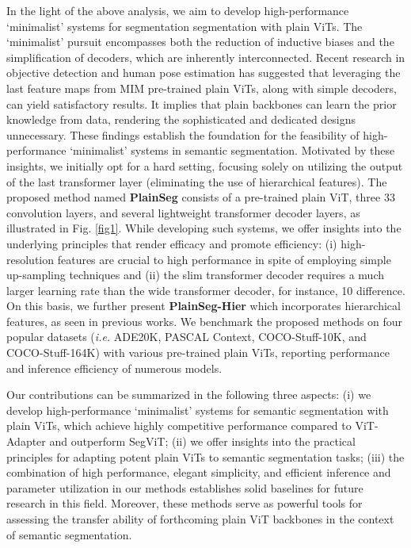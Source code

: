 \documentclass{article} \usepackage{iclr2024_conference,times}
\begin{document}
In the light of the above analysis, we aim to develop high-performance `minimalist' systems for segmentation segmentation with plain ViTs. The `minimalist' pursuit encompasses both the reduction of inductive biases and the simplification of decoders, which are inherently interconnected. Recent research in objective detection \citep{li2022exploring} and human pose estimation \citep{xu2022vitpose} has suggested that leveraging the last feature maps from MIM pre-trained plain ViTs, along with simple decoders, can yield satisfactory results. It implies that plain backbones can learn the prior knowledge from data, rendering the sophisticated and dedicated designs unnecessary. These findings establish the foundation for the feasibility of high-performance `minimalist' systems in semantic segmentation. Motivated by these insights, we initially opt for a hard setting, focusing solely on utilizing the output of the last transformer layer (eliminating the use of hierarchical features). The proposed method named \textbf{PlainSeg} consists of a pre-trained plain ViT, three 33 convolution layers, and several lightweight transformer decoder layers, as illustrated in Fig. \ref{fig1}. While developing such systems, we offer insights into the underlying principles that render efficacy and promote efficiency: (i) high-resolution features are crucial to high performance in spite of employing simple up-sampling techniques and (ii) the slim transformer decoder requires a much larger learning rate than the wide transformer decoder, for instance, 10 difference. On this basis, we further present \textbf{PlainSeg-Hier} which incorporates hierarchical features, as seen in previous works. We benchmark the proposed methods on four popular datasets (\textit{i.e.} ADE20K, PASCAL Context, COCO-Stuff-10K, and COCO-Stuff-164K) with various pre-trained plain ViTs, reporting performance and inference efficiency of numerous models.

Our contributions can be summarized in the following three aspects: (i) we develop high-performance `minimalist' systems for semantic segmentation with plain ViTs, which achieve highly competitive performance compared to ViT-Adapter and outperform SegViT; (ii) we offer insights into the practical principles for adapting potent plain ViTs to semantic segmentation tasks; (iii) the combination of high performance, elegant simplicity, and efficient inference and parameter utilization in our methods establishes solid baselines for future research in this field. Moreover, these methods serve as powerful tools for assessing the transfer ability of forthcoming plain ViT backbones in the context of semantic segmentation.
\end{document}
